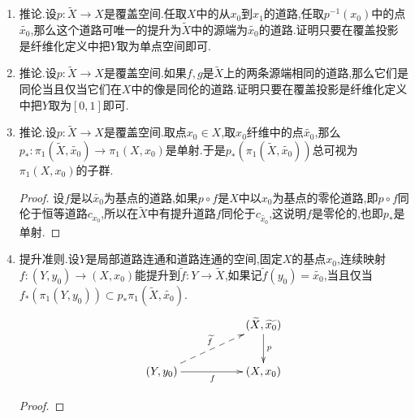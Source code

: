 \begin{enumerate}
\begin{proof}
		取定$Y\to X$的两个连续映射$f,g$,以及从$f$到$g$的同伦$H$,取定$f$关于$p$的提升$\widetilde{f}$.当$U$跑遍$X$的容许开集时构成$X$的开覆盖.于是存在足够大的正整数$n$,对每个点$x\in Y$可以取定一个开邻域$V_x$,使得每个$V_x\times[i/n,(i+1)/n]$在$H$下的像落在某个容许开集中.但是当$U$是容许开集的时候$p^{-1}(U)$同胚于$U\times B$,其中$B$是某个离散空间.所以上一条说明$p$限制在$p^{-1}(U)\to U$是纤维化,所以$H$在每个$V_x\times[i/n,(i+1)/n]$上的限制都可以提升到$\widetilde{X}$上.
		
		\qquad
		
		至此我们证明了$H$在适当的局部上可以提升.下面说明这些局部提升是可以粘合为一个整体提升的.首先考虑$V_x\times[0,1/n]$上的提升,我们断言$x$跑遍$Y$的时候$V_x\times[0,1/n]$上的提升在相交的地方是相同的,这是因为固定任意点$x\in Y$,那么$\{x\}\times[0,1/n]$是连通空间,条件保证了$H(x,0)=\widetilde{H}(x,0)$,我们解释过固定初始条件并且源端为连通空间的映射的提升是唯一的.这就说明这些局部上的提升可以统一粘合为$Y\times[0,1/n]$上的提升.接下来再考虑$V_x\times[1/n,2/n]$,做归纳即得到整体粘合的提升,这得证.
	\end{proof}
	\item 推论.设$p:\widetilde{X}\to X$是覆盖空间.任取$X$中的从$x_0$到$x_1$的道路,任取$p^{-1}(x_0)$中的点$\widetilde{x_0}$,那么这个道路可唯一的提升为$\widetilde{X}$中的源端为$\widetilde{x_0}$的道路.证明只要在覆盖投影是纤维化定义中把$Y$取为单点空间即可.
	\item 推论.设$p:\widetilde{X}\to X$是覆盖空间.如果$f,g$是$\widetilde{X}$上的两条源端相同的道路,那么它们是同伦当且仅当它们在$X$中的像是同伦的道路.证明只要在覆盖投影是纤维化定义中把$Y$取为$[0,1]$即可.
	\item 推论.设$p:\widetilde{X}\to X$是覆盖空间.取点$x_0\in X$,取$x_0$纤维中的点$\widetilde{x_0}$,那么$p_*:\pi_1(\widetilde{X},\widetilde{x_0})\to\pi_1(X,x_0)$是单射.于是$p_*(\pi_1(\widetilde{X},\widetilde{x_0}))$总可视为$\pi_1(X,x_0)$的子群.
	\begin{proof}
		
		设$f$是以$\widetilde{x_0}$为基点的道路,如果$p\circ f$是$X$中以$x_0$为基点的零伦道路,即$p\circ f$同伦于恒等道路$c_{x_0}$,所以在$\widetilde{X}$中有提升道路$f$同伦于$c_{\widetilde{x_0}}$,这说明$f$是零伦的,也即$p_*$是单射.
	\end{proof}
	\item 提升准则.设$Y$是局部道路连通和道路连通的空间,固定$X$的基点$x_0$,连续映射$f:(Y,y_0)\to(X,x_0)$能提升到$\widetilde{f}:Y\to\widetilde{X}$,如果记$\widetilde{f}(y_0)=\widetilde{x_0}$,当且仅当$f_*(\pi_1(Y,y_0))\subset p_*\pi_1(\widetilde{X},\widetilde{x_0})$.
	$$\xymatrix{&&(\widetilde{X},\widetilde{x_0})\ar[d]^{p}\\(Y,y_0)\ar[rr]_f\ar@{-->}[urr]^{\widetilde{f}}&&(X,x_0)}$$
	\begin{proof}
		

\end{proof}
\end{enumerate}
